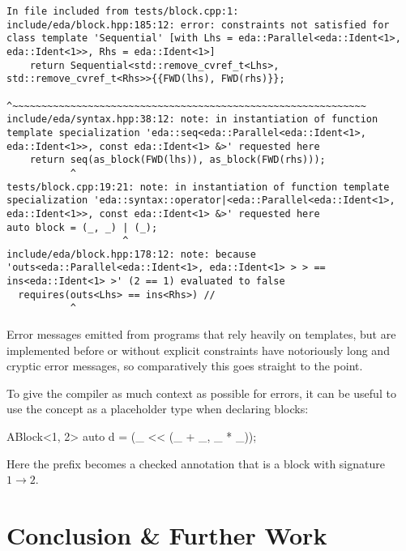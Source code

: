\begin{verbatim}
In file included from tests/block.cpp:1:
include/eda/block.hpp:185:12: error: constraints not satisfied for class template 'Sequential' [with Lhs = eda::Parallel<eda::Ident<1>, eda::Ident<1>>, Rhs = eda::Ident<1>]
    return Sequential<std::remove_cvref_t<Lhs>, std::remove_cvref_t<Rhs>>{{FWD(lhs), FWD(rhs)}};
           ^~~~~~~~~~~~~~~~~~~~~~~~~~~~~~~~~~~~~~~~~~~~~~~~~~~~~~~~~~~~~~
include/eda/syntax.hpp:38:12: note: in instantiation of function template specialization 'eda::seq<eda::Parallel<eda::Ident<1>, eda::Ident<1>>, const eda::Ident<1> &>' requested here
    return seq(as_block(FWD(lhs)), as_block(FWD(rhs)));
           ^
tests/block.cpp:19:21: note: in instantiation of function template specialization 'eda::syntax::operator|<eda::Parallel<eda::Ident<1>, eda::Ident<1>>, const eda::Ident<1> &>' requested here
auto block = (_, _) | (_);
                    ^
include/eda/block.hpp:178:12: note: because 'outs<eda::Parallel<eda::Ident<1>, eda::Ident<1> > > == ins<eda::Ident<1> >' (2 == 1) evaluated to false
  requires(outs<Lhs> == ins<Rhs>) //
           ^
\end{verbatim}

Error messages emitted from programs that rely heavily on templates, but are implemented before or without
explicit constraints have notoriously long and cryptic error messages\footnotemark, so comparatively this
goes straight to the point.


To give the compiler as much context as possible for errors, it can be useful to use the
 concept as a placeholder type when declaring blocks:

\begin{cppcodenl}
  ABlock<1, 2> auto d = (_ << (_ + _, _ * _));
\end{cppcodenl}

Here the  prefix becomes a checked annotation that  is a block with signature $1 \rightarrow 2$.

\section{Conclusion \& Further Work}
\label{sec:eda_conc}

